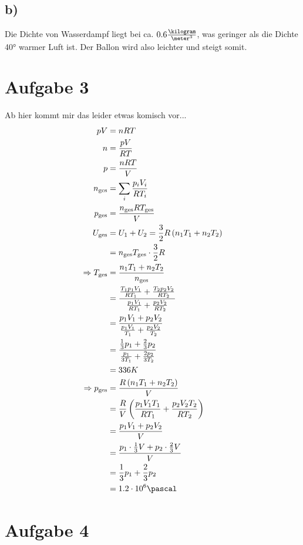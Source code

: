 \documentclass[12pt,a4paper,notitlepage]{article}
\newcommand{\aufgabe}[1]{\section*{\setcounter{section}{#1}Aufgabe #1}}
\begin{document}
\subsection*{b)}
Die Dichte von Wasserdampf liegt bei ca. $0.6\frac{\kilogram}{\meter^3}$, was geringer als die Dichte 40° warmer Luft ist. Der Ballon wird also leichter und steigt somit.
\aufgabe{3}
Ab hier kommt mir das leider etwas komisch vor...
\begin{align}
pV&=nRT\\
n&=\frac{pV}{RT}\\
p&=\frac{nRT}{V}\\
n_\text{ges}&=\sum_i\frac{p_iV_i}{RT_i}\\
p_\text{ges}&=\frac{n_\text{ges}RT_\text{ges}}{V}\\
U_\text{ges}&=U_1+U_2=\frac{3}{2}R\left(n_1T_1+n_2T_2\right)\\
&=n_\text{ges}T_\text{ges}\cdot\frac{3}{2}R\\
\Rightarrow T_\text{ges}&=\frac{n_1T_1+n_2T_2}{n_\text{ges}}\\
&=\frac{\frac{T_1p_1V_1}{RT_1}+\frac{T_2p_2V_2}{RT_2}}{\frac{p_1V_1}{RT_1}+\frac{p_2V_2}{RT_2}}\\
&=\frac{p_1V_1+p_2V_2}{\frac{p_1V_1}{T_1}+\frac{p_2V_2}{T_2}}\\
&=\frac{\frac{1}{3}p_1+\frac{2}{3}p_2}{\frac{p_1}{3T_1}+\frac{2p_2}{3T_2}}\\
&=336K\\
\Rightarrow p_\text{ges}&=\frac{R\left(n_1T_1+n_2T_2\right)}{V}\\
&=\frac{R}{V}\left(\frac{p_1V_1T_1}{RT_1}+\frac{p_2V_2T_2}{RT_2}\right)\\
&=\frac{p_1V_1+p_2V_2}{V}\\
&=\frac{p_1\cdot\frac{1}{3}V+p_2\cdot\frac{2}{3}V}{V}\\
&=\frac{1}{3}p_1+\frac{2}{3}p_2\\
&=1.2\cdot 10^6\pascal
\end{align}
\aufgabe{4}
\end{document}
